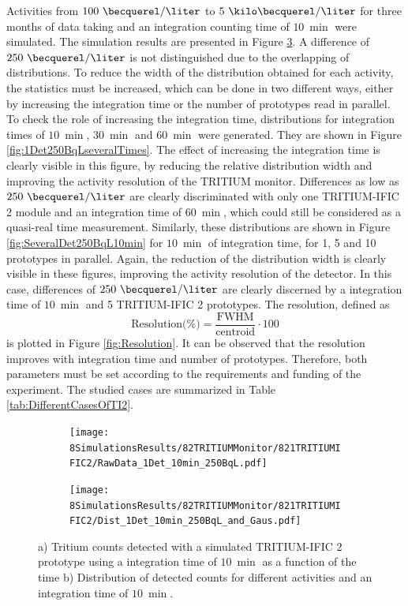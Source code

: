 Activities from $100~\becquerel/\liter$ to $5~\kilo\becquerel/\liter$ for three months of data taking and an integration counting time of $10~\min$ were simulated. The simulation results are presented in Figure \ref{fig:1Det10Min250BqL}. A difference of $250~\becquerel/\liter$ is not distinguished due to the overlapping of distributions. To reduce the width of the distribution obtained for each activity, the statistics must be increased, which can be done in two different ways, either by increasing the integration time or the number of prototypes read in parallel. To check the role of increasing the integration time, distributions for integration times of $10~\min$, $30~\min$ and $60~\min$ were generated. They are shown in Figure \ref{fig:1Det250BqLseveralTimes}. The effect of increasing the integration time is clearly visible in this figure, by reducing the relative distribution width and improving the activity resolution of the TRITIUM monitor. Differences as low as $250~\becquerel/\liter$ are clearly discriminated with only one TRITIUM-IFIC 2 module and an integration time of $60~\min$, which could still be considered as a quasi-real time measurement. Similarly, these distributions are shown in Figure \ref{fig:SeveralDet250BqL10min} for $10~\min$ of integration time, for 1, 5 and 10 prototypes in parallel. Again, the reduction of the distribution width is clearly visible in these figures, improving the activity resolution of the detector. In this case, differences of $250~\becquerel/\liter$ are clearly discerned by a integration time of $10~\min$ and 5 TRITIUM-IFIC 2 prototypes. The resolution, defined as
\begin{equation}
\text{Resolution(\%)}=\frac{\text{FWHM}}{\text{centroid}}\cdot{}100
\label{eq:Resolution}
\end{equation}
is plotted in Figure \ref{fig:Resolution}. It can be observed that the resolution improves with integration time and number of prototypes. Therefore, both parameters must be set according to the requirements and funding of the experiment. The studied cases are summarized in Table \ref{tab:DifferentCasesOfTI2}.


\begin{figure}
\centering
    \begin{subfigure}[b]{0.7\textwidth}
    \centering
    \texttt{[image: 8SimulationsResults/82TRITIUMMonitor/821TRITIUMIFIC2/RawData\_1Det\_10min\_250BqL.pdf]}  
    \caption{\label{subfig:RawData1Det10Min250BqL}}
    \end{subfigure}
    \hfill
    \begin{subfigure}[b]{0.7\textwidth}
    \centering
    \texttt{[image: 8SimulationsResults/82TRITIUMMonitor/821TRITIUMIFIC2/Dist\_1Det\_10min\_250BqL\_and\_Gaus.pdf]}  
    \caption{\label{subfig:Dist1Det10Min250BqL}}
    \end{subfigure}
 \caption{a) Tritium counts detected with a simulated TRITIUM-IFIC 2 prototype using a integration time of $10~\min$ as a function of the time b) Distribution of detected counts for different activities and an integration time of $10~\min$.}
 \label{fig:1Det10Min250BqL}
\end{figure}

